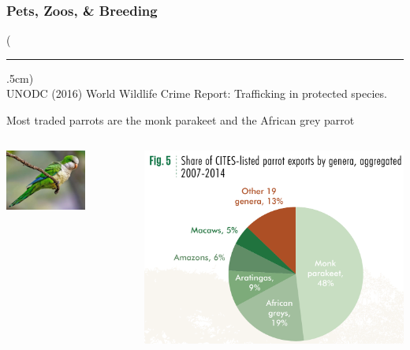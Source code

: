 \documentclass[10pt]{beamer}
\newenvironment{reference}[2]{%
	\begin{textblock*}{\textwidth}(#1,#2)
		\tiny\bgroup\color{gray}}{\egroup\end{textblock*}}
\begin{document}
\begin{frame}[t]
\frametitle{Pets, Zoos, \& Breeding}
\vspace{0.5cm}

	\begin{reference}{4mm}{92mm}
		\rule{1.5cm}{0.25pt}\\
		UNODC (2016) World Wildlife Crime Report: Trafficking in protected species.
	\end{reference}
	
	Most traded parrots are the monk parakeet and the African grey parrot
	
	\vspace{0.5cm}
	
	\begin{columns}
		\begin{column}{0.33\textwidth}
			\begin{center}
				\includegraphics[width=0.65\textwidth]{figures/monk.jpg}
			\end{center}
		\end{column}
		
		\begin{column}{0.33\textwidth}
			\begin{center}
				\includegraphics[width=1.2\textwidth]{figures/parrot_species.png}
			\end{center}
		\end{column}
		

\end{columns}
\end{frame}
\end{document}
